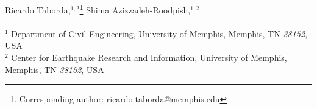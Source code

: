 % 
Ricardo Taborda,$^{1,2}$\thanks{Corresponding author: ricardo.taborda@memphis.edu}
Shima Azizzadeh-Roodpish,$^{1,2}$\vspace{0.5ex} \\  \vspace{1ex} \\
% 
$^1$ Department of Civil Engineering, University of Memphis, Memphis, TN \emph{38152}, USA\\
$^2$ Center for Earthquake Research and Information, University of Memphis, Memphis, TN \emph{38152}, USA
% 

